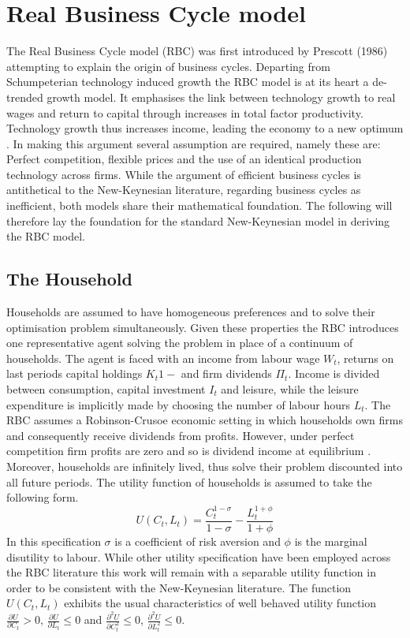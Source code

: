 \documentclass[12pt,a4paper,english]{article} %
\let\oldsection\section
\renewcommand\section{\clearpage\oldsection}
\begin{document}
	\section{Real Business Cycle model}
	The Real Business Cycle model (RBC) was first introduced by Prescott (1986) \cite{prescott_theory_1986} attempting to explain the origin of business cycles. Departing from Schumpeterian technology induced growth the RBC model is at its heart a de-trended growth model. It emphasises the link between technology growth to real wages and return to capital through increases in total factor productivity. Technology growth thus increases income, leading the economy to a new optimum \cite{prescott_theory_1986}. 
	In making this argument several assumption are required, namely these are: Perfect competition, flexible prices and the use of an identical production technology across firms. While the argument of efficient business cycles is antithetical to the New-Keynesian literature, regarding business cycles as inefficient, both models share their mathematical foundation. The following will therefore lay the foundation for the standard New-Keynesian model in deriving the RBC model.
	
	\subsection{The Household}
	Households are assumed to have homogeneous preferences and to solve their optimisation problem simultaneously. Given these properties the RBC introduces one representative agent solving the problem in place of a continuum of households.
	The agent is faced with an income from labour wage $W_t$, returns on last periods capital holdings $K_t{1-}$ and firm dividends $\Pi_t$. Income is divided between consumption, capital investment $I_t$ and leisure, while the leisure expenditure is implicitly made by choosing the number of labour hours $L_t$. The RBC assumes a Robinson-Crusoe economic setting in which households own firms and consequently receive dividends from profits. However, under perfect competition firm profits are zero and so is dividend income at equilibrium \cite{prescott_theory_1986}. 
	Moreover, households are infinitely lived, thus solve their problem discounted into all future periods. The utility function of households is assumed to take the following form.
	\begin{equation}
		U(C_t, L_t) = \frac{C_t^{1-\sigma}}{{1-\sigma}} - \frac{L_t^{1+\phi}}{1+\phi} 
	\end{equation}
	In this specification $\sigma$ is a coefficient of risk aversion and $\phi$ is the marginal disutility to labour. While other utility specification have been employed across the RBC literature this work will remain with a separable utility function in order to be consistent with the New-Keynesian literature. The function $U(C_t, L_t)$ exhibits the usual characteristics of well behaved utility function $\frac{\partial U}{\partial C_t} > 0$, $\frac{\partial U}{\partial L_t} \leq 0$ and $\frac{\partial^2 U}{\partial C_t^2} \leq 0$, $\frac{\partial^2 U}{\partial L_t^2} \leq 0$.
	
\end{document}
